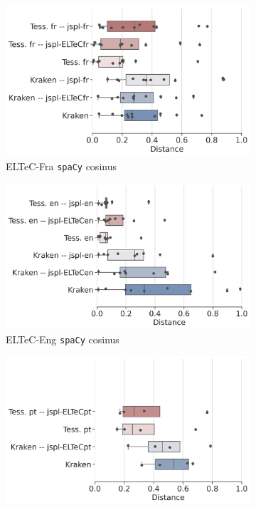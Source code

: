 \begin{figure}[h!]

    \begin{subfigure}{0.45\textwidth}
  \includegraphics[height=.65\textwidth]{IMAGES/Boite-moustache/ELTeC-Fra_spacy3.5.1_cosinus.png} 
        \caption{ELTeC-Fra \texttt{spaCy} cosinus}
   \end{subfigure}
 \begin{subfigure}{0.45\textwidth}
  \includegraphics[height=.65\textwidth]{IMAGES/Boite-moustache/ELTeC-Eng_spacy3.5.1_cosinus.png}
        \caption{ELTeC-Eng \texttt{spaCy} cosinus}
   \end{subfigure}
    \begin{subfigure}{0.5\textwidth}
  \includegraphics[height=.65\textwidth]{IMAGES/Boite-moustache/ELTeC-Por_spaCy3.5.1_cosinus.png} 

\end{subfigure}
\end{figure}
